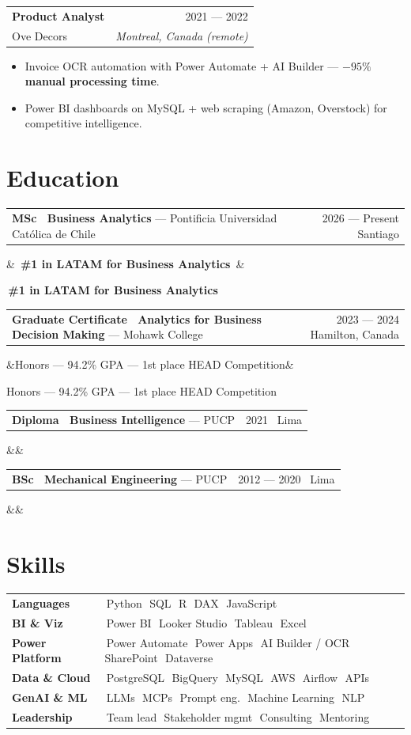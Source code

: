 \documentclass[10pt,letterpaper]{article}
\makeatletter
\newcommand{\jobheader}[4]{%
  \noindent\begin{tabularx}{\linewidth}{@{}X r@{}}
    \textbf{\color{ink}\small #1} & \textcolor{inkmute}{\footnotesize #3} \\[-1pt]
    \textcolor{inkdim}{\footnotesize #2} & \textcolor{inkmute}{\footnotesize\itshape #4}
  \end{tabularx}\par\vspace{1pt}
}
\newcommand{\eduline}[4]{%
  \noindent\begin{tabularx}{\linewidth}{@{}X r@{}}
    \textbf{\color{ink}\small #1} \textcolor{inkdim}{\footnotesize --- #2} & \textcolor{inkmute}{\footnotesize #3}
  \end{tabularx}%
  \ifx&#4&\else\par\textcolor{ink}{\footnotesize #4}\fi
  \par\vspace{1pt}
}
\newcommand{\chip}[1]{%
  \colorbox{chip}{\textcolor{ink}{\footnotesize\,#1\,}}\hspace{0pt}
}
\newcommand{\accentchip}[1]{%
  \colorbox{chip}{\textcolor{accent}{\footnotesize\bfseries\,#1\,}}
}
\makeatother
\begin{document}
\jobheader{Product Analyst}{Ove Decors}{2021 --- 2022}{Montreal, Canada (remote)}
\begin{itemize}\footnotesize
  \item Invoice OCR automation with Power Automate + AI Builder --- \textbf{$-95\%$ manual processing time}.
  \item Power BI dashboards on MySQL + web scraping (Amazon, Overstock) for competitive intelligence.
\end{itemize}

\section*{Education}

\eduline{MSc \textperiodcentered\ Business Analytics}{Pontificia Universidad Católica de Chile}{2026 --- Present \textperiodcentered\ Santiago}{\accentchip{\#1 in LATAM for Business Analytics}}

\eduline{Graduate Certificate \textperiodcentered\ Analytics for Business Decision Making}{Mohawk College}{2023 --- 2024 \textperiodcentered\ Hamilton, Canada}{\textcolor{inkdim}{\footnotesize Honors --- 94.2\% GPA --- 1st place HEAD Competition}}

\eduline{Diploma \textperiodcentered\ Business Intelligence}{PUCP}{2021 \textperiodcentered\ Lima}{}

\eduline{BSc \textperiodcentered\ Mechanical Engineering}{PUCP}{2012 --- 2020 \textperiodcentered\ Lima}{}

\section*{Skills}
\footnotesize
\noindent\begin{tabularx}{\linewidth}{@{}l X@{}}
  \textbf{Languages}      & \chip{Python} \chip{SQL} \chip{R} \chip{DAX} \chip{JavaScript} \\
  \textbf{BI \& Viz}      & \chip{Power BI} \chip{Looker Studio} \chip{Tableau} \chip{Excel} \\
  \textbf{Power Platform} & \chip{Power Automate} \chip{Power Apps} \chip{AI Builder / OCR} \chip{SharePoint} \chip{Dataverse} \\
  \textbf{Data \& Cloud}  & \chip{PostgreSQL} \chip{BigQuery} \chip{MySQL} \chip{AWS} \chip{Airflow} \chip{APIs} \\
  \textbf{GenAI \& ML}    & \chip{LLMs} \chip{MCPs} \chip{Prompt eng.} \chip{Machine Learning} \chip{NLP} \\
  \textbf{Leadership}     & \chip{Team lead} \chip{Stakeholder mgmt} \chip{Consulting} \chip{Mentoring} \\
\end{tabularx}
\end{document}
